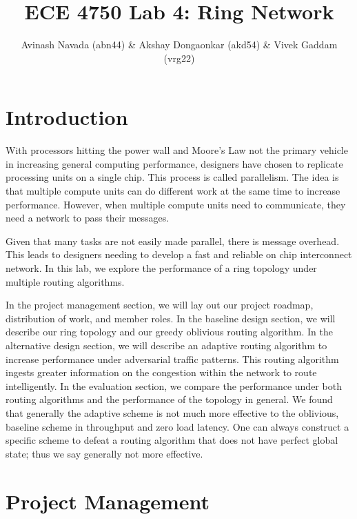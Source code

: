 \documentclass[10pt]{article}
\begin{document}
\title{ECE 4750 Lab 4: Ring Network}
\author{Avinash Navada (abn44) \& Akshay Dongaonkar (akd54) 
		\& Vivek Gaddam (vrg22)}
\maketitle


\section{Introduction}

With processors hitting the power wall and Moore's Law not the primary vehicle
in increasing general computing performance, designers have chosen to
replicate processing units on a single chip. 
This process is called parallelism. 
The idea is that multiple compute units can do different work at the same time
to increase performance.
However, when multiple compute units need to communicate, they need a network
to pass their messages. \par

Given that many tasks are not easily made parallel, there is message overhead.
This leads to designers needing to develop a fast and reliable
on chip interconnect network.
In this lab, we explore the performance of a ring topology under multiple
routing algorithms. \par

In the project management section, we will lay out our project roadmap,
distribution of work, and member roles.
In the baseline design section, we will describe our ring topology and our 
greedy oblivious routing algorithm.
In the alternative design section, we will describe an adaptive routing 
algorithm to increase performance under adversarial traffic patterns.
This routing algorithm ingests greater information on the congestion within
the network to route intelligently.
In the evaluation section, we compare the performance under both routing
algorithms and the performance of the topology in general. 
We found that generally the adaptive scheme is not much more effective to the 
oblivious, baseline scheme in throughput and zero load latency. 
One can always construct a specific scheme to defeat a routing algorithm that
does not have perfect global state; thus we say generally not more effective.


\section{Project Management}
\end{document}
